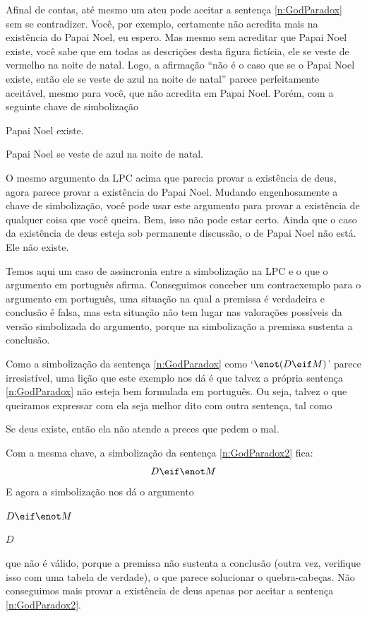 Afinal de contas, até mesmo um ateu pode aceitar a sentença \ref{n:GodParadox} sem se contradizer.
Você, por exemplo, certamente não acredita mais na existência do Papai Noel, eu espero.
Mas mesmo sem acreditar que Papai Noel existe, você sabe que em todas as descrições desta figura fictícia, ele se veste de vermelho na noite de natal.
Logo, a afirmação ``não é o caso que se o Papai Noel existe, então ele se veste de azul na noite de natal'' parece perfeitamente aceitável, mesmo para você, que não acredita em Papai Noel.
Porém, com a seguinte chave de simbolização
\begin{ekey}
	\item[D] Papai Noel existe.
	\item[M] Papai Noel se veste de azul na noite de natal.
\end{ekey}
O mesmo argumento da LPC acima que parecia provar a existência de deus, agora parece provar a existência do Papai Noel.
Mudando engenhosamente a chave de simbolização, você pode usar este argumento para provar a existência de qualquer coisa que você queira.
Bem, isso não pode estar certo.
Ainda que o caso da existência de deus esteja sob permanente discussão, o de Papai Noel não está. Ele não existe. %

Temos aqui um caso de assincronia entre a simbolização na LPC e o que o argumento em português afirma.
Conseguimos conceber um contraexemplo para o argumento em português, uma situação na qual a premissa é verdadeira e conclusão é falsa, mas esta situação não tem lugar nas valorações possíveis da versão simbolizada do argumento, porque na simbolização a premissa sustenta a conclusão.

Como a simbolização da sentença \ref{n:GodParadox} como `$\enot (D \eif M)$' parece irresistível, uma lição que este exemplo nos dá é que talvez a própria sentença \ref{n:GodParadox} não esteja bem formulada em português.
Ou seja, talvez o que queiramos expressar com ela seja melhor dito com outra sentença, tal como
        	\begin{earg}
                  \setcounter{eargnum}{3}	
                \item\label{n:GodParadox2} Se deus existe, então ela não atende a preces que pedem o mal.
  \end{earg}
Com a mesma chave, a simbolização da sentença \ref{n:GodParadox2} fica:
$$D \eif \enot M$$
E agora a simbolização nos dá o argumento
	\begin{earg}
		\item[] $D \eif \enot M$
		\item[\therefore] $D$
	\end{earg}
que não é válido, porque a premissa não sustenta a conclusão (outra vez, verifique isso com uma tabela de verdade), o que parece solucionar o quebra-cabeças.
Não conseguimos mais provar a existência de deus apenas por aceitar a sentença  \ref{n:GodParadox2}.

